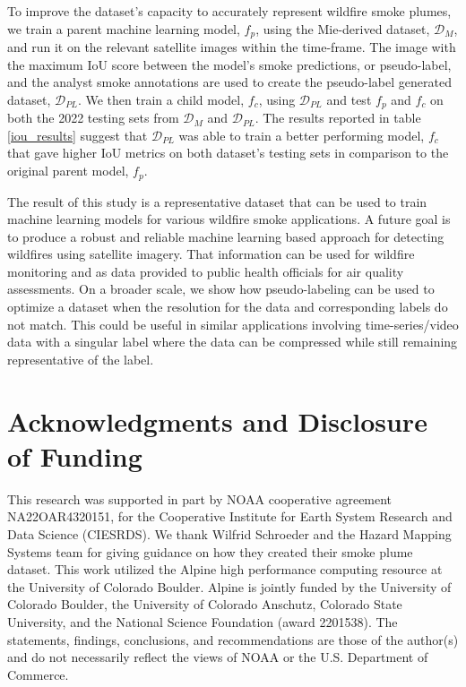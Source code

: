 \documentclass{article}
\begin{document}
To improve the dataset's capacity to accurately represent wildfire smoke plumes, we train a parent machine learning model, \(f_p\),  using the Mie-derived dataset, \(\mathcal{D}_M\), and run it on the relevant satellite images within the time-frame. The image with the maximum IoU score between the model's smoke predictions, or pseudo-label, and the analyst smoke annotations are used to create the pseudo-label generated dataset, \(\mathcal{D}_{PL}\). We then train a child model, \(f_c\), using \(\mathcal{D}_{PL}\) and test \(f_p\) and \(f_c\) on both the 2022 testing sets from \(\mathcal{D}_{M}\) and \(\mathcal{D}_{PL}\). The results reported in table \ref{iou_results} suggest that \(\mathcal{D}_{PL}\) was able to train a better performing model, \(f_c\) that gave higher IoU metrics on both dataset's testing sets in comparison to the original parent model, \(f_p\).

The result of this study is a representative dataset that can be used to train machine learning models for various wildfire smoke applications. A future goal is to produce a robust and reliable machine learning based approach for detecting wildfires using satellite imagery. That information can be used for wildfire monitoring and as data provided to public health officials for air quality assessments. On a broader scale, we show how pseudo-labeling can be used to optimize a dataset when the resolution for the data and corresponding labels do not match. This could be useful in similar applications involving time-series/video data with a singular label where the data can be compressed while still remaining representative of the label. 

\section{Acknowledgments and Disclosure of Funding}

This research was supported in part by NOAA cooperative agreement NA22OAR4320151, for the Cooperative Institute for Earth System Research and Data Science (CIESRDS). We thank Wilfrid Schroeder and the Hazard Mapping Systems team for giving guidance on how they created their smoke plume dataset. This work utilized the Alpine high performance computing resource at the University of Colorado Boulder. Alpine is jointly funded by the University of Colorado Boulder, the University of Colorado Anschutz, Colorado State University, and the National Science Foundation (award 2201538). The statements, findings, conclusions, and recommendations are those of the author(s) and do not necessarily reflect the views of NOAA or the U.S. Department of Commerce. 


\end{document}
